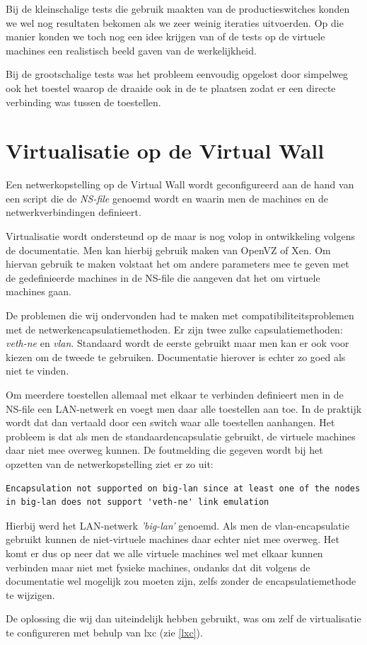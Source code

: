 Bij de kleinschalige tests die gebruik maakten van de productieswitches konden we wel nog resultaten bekomen als we zeer weinig iteraties uitvoerden.
Op die manier konden we toch nog een idee krijgen van of de tests op de virtuele machines een realistisch beeld gaven van de werkelijkheid.

Bij de grootschalige tests was het probleem eenvoudig opgelost door simpelweg ook het toestel waarop de \nwmretriever{} draaide ook in de \vwall{} te plaatsen
zodat er een directe verbinding was tussen de toestellen.


\section{Virtualisatie op de Virtual Wall}
\label{probleem-virtualisatie-vwall}

Een netwerkopstelling op de Virtual Wall wordt geconfigureerd aan de hand van een script die de \textit{NS-file} genoemd wordt en
waarin men de machines en de netwerkverbindingen definieert.

Virtualisatie wordt ondersteund op de \vwall{} maar is nog volop in ontwikkeling volgens de documentatie.
Men kan hierbij gebruik maken van OpenVZ of Xen\cite{vwall-openvz, vwall-xen}.
Om hiervan gebruik te maken volstaat het om andere parameters mee te geven met de gedefinieerde machines in de NS-file die aangeven dat het om virtuele machines gaan.

De problemen die wij ondervonden had te maken met compatibiliteitsproblemen met de netwerkencapsulatiemethoden.
Er zijn twee zulke capsulatiemethoden: \textit{veth-ne} en \textit{vlan}.
Standaard wordt de eerste gebruikt maar men kan er ook voor kiezen om de tweede te gebruiken.
Documentatie hierover is echter zo goed als niet te vinden.

Om meerdere toestellen allemaal met elkaar te verbinden definieert men in de NS-file een LAN-netwerk en voegt men daar alle toestellen aan toe.
In de praktijk wordt dat dan vertaald door een switch waar alle toestellen aanhangen.
Het probleem is dat als men de standaardencapsulatie gebruikt, de virtuele machines daar niet mee overweg kunnen.
De foutmelding die gegeven wordt bij het opzetten van de netwerkopstelling ziet er zo uit:

\begin{lstlisting}
Encapsulation not supported on big-lan since at least one of the nodes in big-lan does not support 'veth-ne' link emulation
\end{lstlisting}

Hierbij werd het LAN-netwerk \textit{'big-lan'} genoemd.
Als men de vlan-encapsulatie gebruikt kunnen de niet-virtuele machines daar echter niet mee overweg.
Het komt er dus op neer dat we alle virtuele machines wel met elkaar kunnen verbinden maar niet met fysieke machines,
ondanks dat dit volgens de documentatie wel mogelijk zou moeten zijn, zelfs zonder de encapsulatiemethode te wijzigen\cite{vwall-openvz}.

De oplossing die wij dan uiteindelijk hebben gebruikt, was om zelf de virtualisatie te configureren met behulp van \gls{lxc} (zie \cref{lxc}).